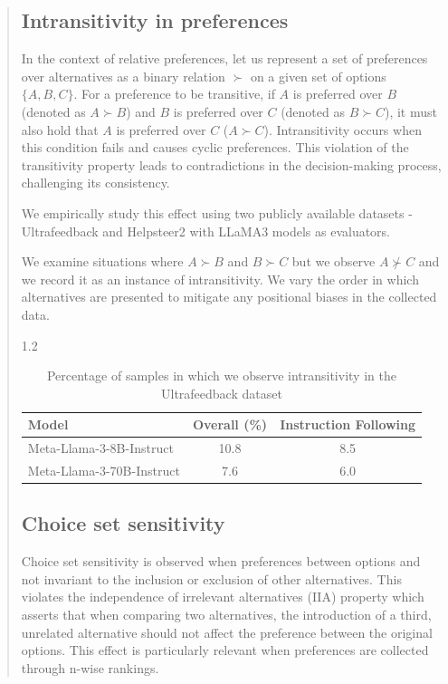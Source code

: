\documentclass{article}
\begin{document}
\begin{abstract}
\subsection{Intransitivity in preferences}
\label{app:instransitivity}
In the context of relative preferences, let us represent a set of preferences over alternatives as a binary relation $ \succ $ on a given set of options $ \{A, B, C\} $. For a preference to be transitive, if $ A $ is preferred over $ B $ (denoted as $ A \succ B $) and $ B $ is preferred over $ C $ (denoted as $ B \succ C $), it must also hold that $ A $ is preferred over $ C $ ($ A \succ C $). Intransitivity occurs when this condition fails and causes cyclic preferences. This violation of the transitivity property leads to contradictions in the decision-making process, challenging its consistency.

We empirically study this effect using two publicly available datasets - Ultrafeedback \cite{cui2023ultrafeedback} and Helpsteer2 \cite{wang2024helpsteer2} with  LLaMA3 models as evaluators. 

We examine situations where \(A \succ B \) and \(B \succ C \) but we observe \(A \nsucc C \) and we record it as an instance of intransitivity. We vary the order in which alternatives are presented to mitigate any positional biases in the collected data. 

\begin{table}[h]
    \centering
    \small
    \setlength{\tabcolsep}{12pt}
    \renewcommand{\arraystretch}{1.5}1.2
    
    \begin{tabular}{@{}lcc@{}}
        \toprule
        \textbf{Model} & \textbf{Overall (\%)} & \textbf{Instruction Following} \\
        \midrule
        Meta-Llama-3-8B-Instruct & 10.8 & 8.5 \\
        Meta-Llama-3-70B-Instruct & 7.6 & 6.0 \\
        \bottomrule
    \end{tabular}
    
    \caption{Percentage of samples in which we observe intransitivity in the Ultrafeedback dataset}
    \label{tab:performance}
    \vspace{1.5\baselineskip}
\end{table}

\subsection{Choice set sensitivity}
\label{app:choice_set}
Choice set sensitivity is observed when preferences between options and not invariant to the inclusion or exclusion of other alternatives. This violates the independence of irrelevant alternatives (IIA) property \cite{mcfadden_conditional_1974} which asserts that when comparing two alternatives, the introduction of a third, unrelated alternative should not affect the preference between the original options. This effect is particularly relevant when preferences are collected through n-wise rankings.


\end{abstract}
\end{document}
